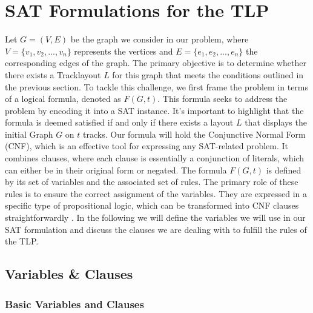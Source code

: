 \documentclass[bachelor, english]{algothesis}
\begin{document}
\chapter{SAT Formulations for the TLP}
Let $G = (V,E)$ be the graph we consider in our problem, where $V =\{v_1,v_2,...,v_n\}$ represents the vertices and $E = \{e_1,e_2,...,e_n\}$ the corresponding edges of the graph. The primary objective is to determine whether there exists a Tracklayout $L$ for this graph that meets the conditions outlined in the previous section. To tackle this challenge, we first frame the problem in terms of a logical formula, denoted as $F(G, t)$. This formula seeks to address the problem by encoding it into a SAT instance. It's important to highlight that the formula is deemed satisfied if and only if there exists a layout $L$ that displays the initial Graph $G$ on $t$ tracks. Our formula will hold the Conjunctive Normal Form (CNF), which is an effective tool for expressing any SAT-related problem. It combines clauses, where each clause is essentially a conjunction of literals, which can either be in their original form or negated. The formula $F(G, t)$ is defined by its set of variables and the associated set of rules. The primary role of these rules is to ensure the correct assignment of the variables. They are expressed in a specific type of propositional logic, which can be  transformed into CNF clauses straightforwardly \cite{conjunction}. In the following we will define the variables we will use in our SAT formulation and discuss the clauses we are dealing with to fulfill the rules of the TLP.

\section{Variables \& Clauses}
\label{sec:vars_clauses}
\subsection{Basic Variables and Clauses}
\label{sec:basic_clauses}
\end{document}
